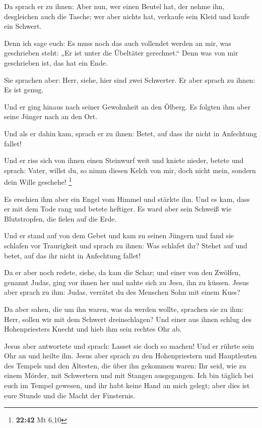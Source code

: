  Da sprach er zu ihnen: Aber nun, wer einen Beutel hat, der
nehme ihn, desgleichen auch die Tasche; wer aber nichts hat, verkaufe
sein Kleid und kaufe ein Schwert.

 Denn ich sage euch: Es muss noch das auch vollendet werden
an mir, was geschrieben steht: „Er ist unter die Übeltäter gerechnet.``
Denn was von mir geschrieben ist, das hat ein Ende.

 Sie sprachen aber: Herr, siehe, hier sind zwei Schwerter.
Er aber sprach zu ihnen: Es ist genug.

 Und er ging hinaus nach seiner Gewohnheit an den Ölberg.
Es folgten ihm aber seine Jünger nach an den Ort.

 Und als er dahin kam, sprach er zu ihnen: Betet, auf dass
ihr nicht in Anfechtung fallet!

 Und er riss sich von ihnen einen Steinwurf weit und kniete
nieder, betete  und sprach: Vater, willst du, so nimm
diesen Kelch von mir, doch nicht mein, sondern dein Wille geschehe!
\footnote{\textbf{22:42} Mt 6,10}

 Es erschien ihm aber ein Engel vom Himmel und stärkte ihn.
 Und es kam, dass er mit dem Tode rang und betete heftiger.
Es ward aber sein Schweiß wie Blutstropfen, die fielen auf die Erde.

 Und er stand auf von dem Gebet und kam zu seinen Jüngern
und fand sie schlafen vor Traurigkeit  und sprach zu ihnen:
Was schlafet ihr? Stehet auf und betet, auf das ihr nicht in Anfechtung
fallet!

 Da er aber noch redete, siehe, da kam die Schar; und einer
von den Zwölfen, genannt Judas, ging vor ihnen her und nahte sich zu
Jesu, ihn zu küssen.  Jesus aber sprach zu ihm: Judas,
verrätst du des Menschen Sohn mit einem Kuss?

 Da aber sahen, die um ihn waren, was da werden wollte,
sprachen sie zu ihm: Herr, sollen wir mit dem Schwert dreinschlagen?
 Und einer aus ihnen schlug des Hohenpriesters Knecht und
hieb ihm sein rechtes Ohr ab.

 Jesus aber antwortete und sprach: Lasset sie doch so
machen! Und er rührte sein Ohr an und heilte ihn.  Jesus
aber sprach zu den Hohenpriestern und Hauptleuten des Tempels und den
Ältesten, die über ihn gekommen waren: Ihr seid, wie zu einem Mörder,
mit Schwertern und mit Stangen ausgegangen.  Ich bin
täglich bei euch im Tempel gewesen, und ihr habt keine Hand an mich
gelegt; aber dies ist eure Stunde und die Macht der Finsternis.


